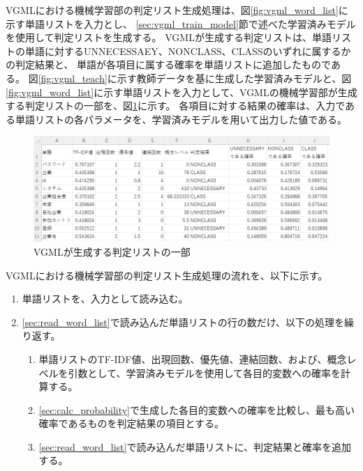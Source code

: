 VGMLにおける機械学習部の判定リスト生成処理は、図\ref{fig:vgml_word_list}に示す単語リストを入力とし、
\ref{sec:vgml_train_model}節で述べた学習済みモデルを使用して判定リストを生成する。
VGMLが生成する判定リストは、単語リストの単語に対するUNNECESSAEY、NONCLASS、CLASSのいずれに属するかの判定結果と、
単語が各項目に属する確率を単語リストに追加したものである。
図\ref{fig:vgml_teach}に示す教師データを基に生成した学習済みモデルと、図\ref{fig:vgml_word_list}に示す単語リストを入力として、VGMLの機械学習部が生成する判定リストの一部を、図\ref{fig:vgml_judge_list}に示す。
各項目に対する結果の確率は、入力である単語リストの各パラメータを、学習済みモデルを用いて出力した値である。

\begin{figure}[t]
    \begin{center}
        \includegraphics[width=1.0\columnwidth]{image/vgml_judge_list.png}
        \caption{VGMLが生成する判定リストの一部}
        \label{fig:vgml_judge_list}
    \end{center}
\end{figure}

VGMLにおける機械学習部の判定リスト生成処理の流れを、以下に示す。

\begin{enumerate}
    \item 単語リストを、入力として読み込む。
    \label{sec:read_word_list}
    \item \ref{sec:read_word_list}で読み込んだ単語リストの行の数だけ、以下の処理を繰り返す。
        \begin{enumerate}
            \item 単語リストのTF-IDF値、出現回数、優先値、連結回数、および、概念レベルを引数として、学習済みモデルを使用して各目的変数への確率を計算する。
            \label{sec:calc_probability}
            \item \ref{sec:calc_probability}で生成した各目的変数への確率を比較し、最も高い確率であるものを判定結果の項目とする。
            \item \ref{sec:read_word_list}で読み込んだ単語リストに、判定結果と確率を追加する。
        \end{enumerate}
\end{enumerate}

